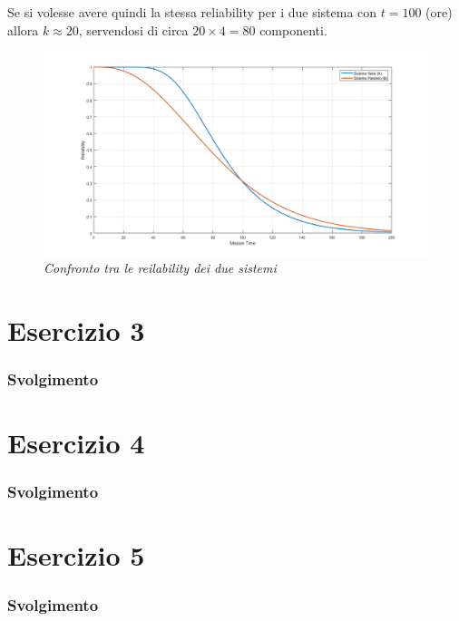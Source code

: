 Se si volesse avere quindi la stessa reliability per i due sistema con $t=100$ (ore) allora $k\approx20$, servendosi di circa $20\times 4 = 80$ componenti.
\begin{figure}[H]
	\centering
	\includegraphics[width=\textwidth]{img/hw5/es2_grafico3.png}
	\caption{\textit{Confronto tra le reilability dei due sistemi}}
\end{figure}

\section{Esercizio 3}
\subsubsection{Svolgimento}
\section{Esercizio 4}
\subsubsection{Svolgimento}
\section{Esercizio 5}
\subsubsection{Svolgimento}